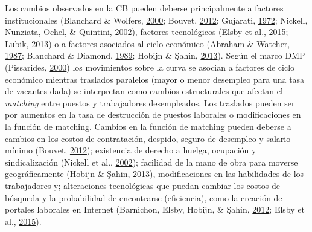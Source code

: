 \documentclass[12pt,oneside]{reedthesis}
\begin{document}
Los cambios observados en la CB pueden deberse principalmente a factores institucionales (Blanchard \& Wolfers, \protect\hyperlink{ref-Blanchard2000}{2000}; Bouvet, \protect\hyperlink{ref-Bouvet2012}{2012}; Gujarati, \protect\hyperlink{ref-Gujarati1972}{1972}; Nickell, Nunziata, Ochel, \& Quintini, \protect\hyperlink{ref-Nickell2002}{2002}), factores tecnológicos (Elsby et al., \protect\hyperlink{ref-Elsby2015}{2015}; Lubik, \protect\hyperlink{ref-Lubik2013}{2013}) o a factores asociados al ciclo económico (Abraham \& Watcher, \protect\hyperlink{ref-Abraham1987}{1987}; Blanchard \& Diamond, \protect\hyperlink{ref-Blanchard1989}{1989}; Hobijn \& Şahin, \protect\hyperlink{ref-Hobijn2013}{2013}). Según el marco DMP (Pissarides, \protect\hyperlink{ref-Pissarides2000}{2000}) los movimientos sobre la curva se asocian a factores de ciclo económico mientras traslados paralelos (mayor o menor desempleo para una tasa de vacantes dada) se interpretan como cambios estructurales que afectan el \emph{matching} entre puestos y trabajadores desempleados. Los traslados pueden ser por aumentos en la tasa de destrucción de puestos laborales o modificaciones en la función de matching. Cambios en la función de matching pueden deberse a cambios en los costos de contratación, despido, seguro de desempleo y salario mínimo (Bouvet, \protect\hyperlink{ref-Bouvet2012}{2012}); existencia de derecho a huelga, ocupación y sindicalización (Nickell et al., \protect\hyperlink{ref-Nickell2002}{2002}); facilidad de la mano de obra para moverse geográficamente (Hobijn \& Şahin, \protect\hyperlink{ref-Hobijn2013}{2013}), modificaciones en las habilidades de los trabajadores y; alteraciones tecnológicas que puedan cambiar los costos de búsqueda y la probabilidad de encontrarse (eficiencia), como la creación de portales laborales en Internet (Barnichon, Elsby, Hobijn, \& Şahin, \protect\hyperlink{ref-Barnichon2012}{2012}; Elsby et al., \protect\hyperlink{ref-Elsby2015}{2015}).
\end{document}
